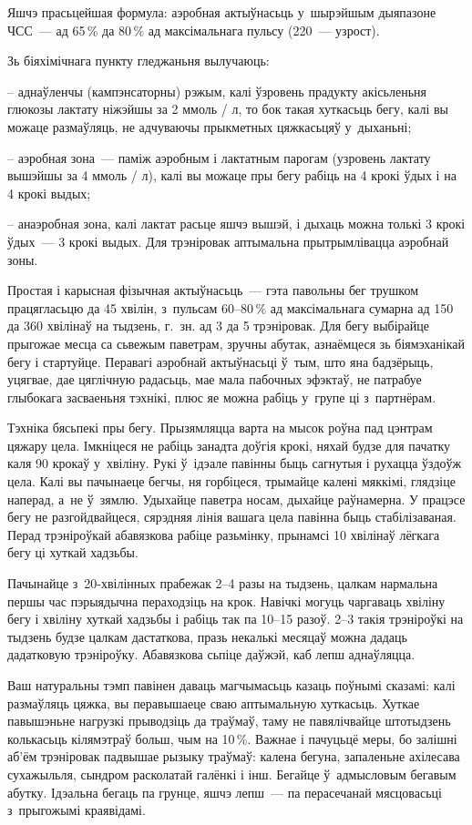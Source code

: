 Яшчэ прасьцейшая формула: аэробная актыўнасьць у~шырэйшым дыяпазоне ЧСС~--- ад 65\,\% да 80\,\% ад максімальнага пульсу (220~--- узрост).

Зь біяхімічнага пункту гледжаньня вылучаюць: 

– аднаўленчы (кампэнсаторны) рэжым, калі ўзровень прадукту акісьленьня глюкозы лактату ніжэйшы за 2 ммоль / л, то бок такая хуткасьць бегу, калі вы можаце размаўляць, не адчуваючы прыкметных цяжкасьцяў у~дыханьні;

– аэробная зона~--- паміж аэробным і лактатным парогам (узровень лактату вышэйшы за 4 ммоль / л), калі вы можаце пры бегу рабіць на 4 крокі ўдых і на 4 крокі выдых;

– анаэробная зона, калі лактат расьце яшчэ вышэй, і дыхаць можна толькі 3 крокі ўдых~--- 3 крокі выдых. Для трэніровак аптымальна прытрымлівацца аэробнай зоны.

Простая і карысная фізычная актыўнасьць~--- гэта павольны бег трушком працягласьцю да 45 хвілін, з~пульсам 60--80\,\% ад максімальнага сумарна ад 150 да 360 хвілінаў на тыдзень, г.~зн. ад 3 да 5 трэніровак. Для бегу выбірайце прыгожае месца са сьвежым паветрам, зручны абутак, азнаёмцеся зь біямэханікай бегу і стартуйце. Перавагі аэробнай актыўнасьці ў~тым, што яна бадзёрыць, уцягвае, дае цяглічную радасьць, мае мала пабочных эфэктаў, не патрабуе глыбокага засваеньня тэхнікі, плюс яе можна рабіць у~групе ці з~партнёрам.

Тэхніка бясьпекі пры бегу. Прызямляцца варта на мысок роўна пад цэнтрам цяжару цела. Імкніцеся не рабіць занадта доўгія крокі, няхай будзе для пачатку каля 90 крокаў у~хвіліну. Рукі ў~ідэале павінны быць сагнутыя і рухацца ўздоўж цела. Калі вы пачынаеце бегчы, ня горбіцеся, трымайце калені мяккімі, глядзіце наперад, а~не ў~зямлю. Удыхайце паветра носам, дыхайце раўнамерна. У працэсе бегу не разгойдвайцеся, сярэдняя лінія вашага цела павінна быць стабілізаваная. Перад трэніроўкай абавязкова рабіце разьмінку, прынамсі 10 хвілінаў лёгкага бегу ці хуткай хадзьбы.

Пачынайце з~20-хвілінных прабежак 2--4 разы на тыдзень, цалкам нармальна першы час пэрыядычна пераходзіць на крок. Навічкі могуць чаргаваць хвіліну бегу і хвіліну хуткай хадзьбы і рабіць так па 10--15 разоў. 2--3 такія трэніроўкі на тыдзень будзе цалкам дастаткова, празь некалькі месяцаў можна дадаць дадатковую трэніроўку. Абавязкова сьпіце даўжэй, каб лепш аднаўляцца.

Ваш натуральны тэмп павінен даваць магчымасьць казаць поўнымі сказамі: калі размаўляць цяжка, вы перавышаеце сваю аптымальную хуткасьць. Хуткае павышэньне нагрузкі прыводзіць да траўмаў, таму не павялічвайце штотыдзень колькасьць кілямэтраў больш, чым на 10\,\%. Важнае і пачуцьцё меры, бо залішні аб'ём трэніровак падвышае рызыку траўмаў: калена бегуна, запаленьне ахілесава сухажыльля, сындром расколатай галёнкі і інш. Бегайце ў~адмысловым бегавым абутку. Ідэальна бегаць па грунце, яшчэ лепш~--- па перасечанай мясцовасьці з~прыгожымі краявідамі.

